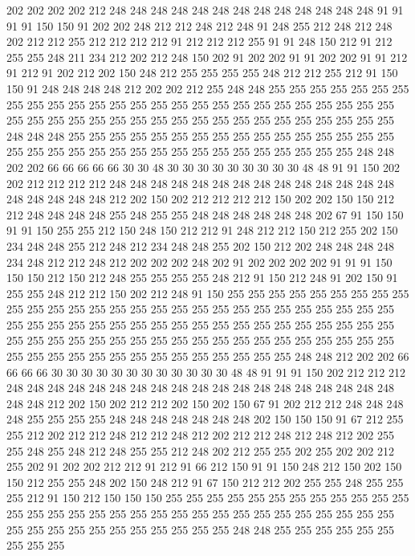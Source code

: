 202 202 202 202 212 248 248 248 248 248 248 248 248 248 248 248 248 248 91 91
91 91 150 150 91 202 202 248 212 212 248 212 248 91 248 255 212 248 212 248
202 212 212 255 212 212 212 212 91 212 212 212 255 91 91 248 150 212 91 212
255 255 248 211 234 212 202 212 248 150 202 91 202 202 91 91 202 202 91 91
212 91 212 91 202 212 202 150 248 212 255 255 255 255 248 212 212 255 212 91
150 150 91 248 248 248 248 212 202 202 212 255 248 248 255 255 255 255 255 255
255 255 255 255 255 255 255 255 255 255 255 255 255 255 255 255 255 255 255 255
255 255 255 255 255 255 255 255 255 255 255 255 255 255 255 255 255 255 255 248
248 248 255 255 255 255 255 255 255 255 255 255 255 255 255 255 255 255 255 255
255 255 255 255 255 255 255 255 255 255 255 255 255 255 255 248 248 202 202 66
66 66 66 66 30 30 48 30 30 30 30 30 30 30 30 30 48 48 91 91
150 202 202 212 212 212 212 248 248 248 248 248 248 248 248 248 248 248 248 248
248 248 248 248 248 248 212 202 150 202 212 212 212 212 150 202 202 150 150 212
212 248 248 248 248 255 248 255 255 248 248 248 248 248 248 202 67 91 150 150
91 91 150 255 255 212 150 248 150 212 212 91 248 212 212 150 212 255 202 150
234 248 248 255 212 248 212 234 248 248 255 202 150 212 202 248 248 248 248 234
248 212 212 248 212 202 202 202 248 202 91 202 202 202 202 91 91 91 150 150
150 212 150 212 248 255 255 255 255 248 212 91 150 212 248 91 202 150 91 255
255 248 212 212 150 202 212 248 91 150 255 255 255 255 255 255 255 255 255 255
255 255 255 255 255 255 255 255 255 255 255 255 255 255 255 255 255 255 255 255
255 255 255 255 255 255 255 255 255 255 255 255 255 255 255 255 255 255 255 255
255 255 255 255 255 255 255 255 255 255 255 255 255 255 255 255 255 255 255 255
255 255 255 255 255 255 255 255 255 255 248 248 212 202 202 66 66 66 66 30
30 30 30 30 30 30 30 30 30 30 30 48 48 91 91 91 150 202 212 212
212 248 248 248 248 248 248 248 248 248 248 248 248 248 248 248 248 248 248 248
248 248 212 202 150 202 212 212 202 150 202 150 67 91 202 212 212 248 248 248
248 255 255 255 255 248 248 248 248 248 248 248 202 150 150 150 91 67 212 255
255 212 202 212 212 248 212 212 248 212 202 212 212 248 212 248 212 202 255 255
248 255 248 212 248 255 255 212 248 202 212 255 255 202 255 202 202 212 255 202
91 202 202 212 212 91 212 91 66 212 150 91 91 150 248 212 150 202 150 150
212 255 255 248 202 150 248 212 91 67 150 212 212 202 255 255 248 255 255 255
212 91 150 212 150 150 150 255 255 255 255 255 255 255 255 255 255 255 255 255
255 255 255 255 255 255 255 255 255 255 255 255 255 255 255 255 255 255 255 255
255 255 255 255 255 255 255 255 255 248 248 255 255 255 255 255 255 255 255 255
